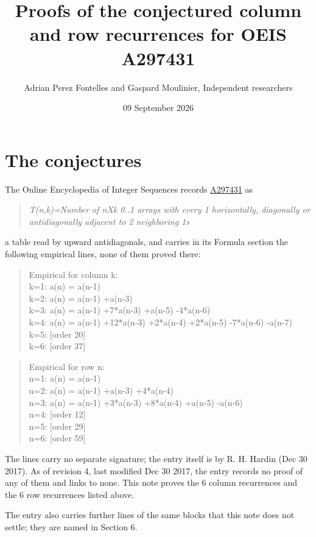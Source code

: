 \documentclass[11pt]{article}
\title{Proofs of the conjectured column and row recurrences for OEIS A297431}
\author{Adrian Perez Fontelles and Gaspard Moulinier, Independent researchers}
\date{09 September 2026}
\theoremstyle{definition}
\begin{document}
\maketitle
\section{The conjectures}

The Online Encyclopedia of Integer Sequences records \href{https://oeis.org/A297431}{A297431} as

\begin{quote}\itshape T(n,k)=Number of nXk 0..1 arrays with every 1 horizontally, diagonally or antidiagonally adjacent to 2 neighboring 1s\end{quote}

a table read by upward antidiagonals, and carries in its Formula section the following empirical lines, none of them proved there:

\begin{quote}\ttfamily Empirical for column k:\\
k=1: a(n) = a(n-1)\\k=2: a(n) = a(n-1) +a(n-3)\\k=3: a(n) = a(n-1) +7*a(n-3) +a(n-5) -4*a(n-6)\\k=4: a(n) = a(n-1) +12*a(n-3) +2*a(n-4) +2*a(n-5) -7*a(n-6) -a(n-7)\\k=5: [order 20]\\k=6: [order 37]\end{quote}

\begin{quote}\ttfamily Empirical for row n:\\
n=1: a(n) = a(n-1)\\n=2: a(n) = a(n-1) +a(n-3) +4*a(n-4)\\n=3: a(n) = a(n-1) +3*a(n-3) +8*a(n-4) +a(n-5) -a(n-6)\\n=4: [order 12]\\n=5: [order 29]\\n=6: [order 59]\end{quote}

The lines carry no separate signature; the entry itself is by R. H. Hardin (Dec 30 2017). As of revision 4, last modified Dec 30 2017, the entry records no proof of any of them and links to none. This note proves the 6 column recurrences and the 6 row recurrences listed above.

The entry also carries further lines of the same blocks that this note does not settle; they are named in Section 6.
\end{document}
